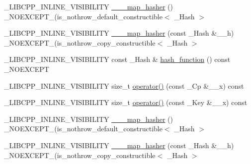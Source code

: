 \begin{DoxyCompactItemize}
\item 
\+\_\+\+L\+I\+B\+C\+P\+P\+\_\+\+I\+N\+L\+I\+N\+E\+\_\+\+V\+I\+S\+I\+B\+I\+L\+I\+T\+Y \hyperlink{class______map__hasher_3_01___key_00_01___cp_00_01___hash_00_01false_01_4_ae1078b1247c357a13a8d2f6ef1ec4399}{\+\_\+\+\_\+\+\_\+map\+\_\+hasher} () \+\_\+\+N\+O\+E\+X\+C\+E\+P\+T\+\_\+(is\+\_\+nothrow\+\_\+default\+\_\+constructible$<$ \+\_\+\+Hash $>$
\item 
\+\_\+\+L\+I\+B\+C\+P\+P\+\_\+\+I\+N\+L\+I\+N\+E\+\_\+\+V\+I\+S\+I\+B\+I\+L\+I\+T\+Y \hyperlink{class______map__hasher_3_01___key_00_01___cp_00_01___hash_00_01false_01_4_a76cca625eb676b114276721b9818cc0b}{\+\_\+\+\_\+\+\_\+map\+\_\+hasher} (const \+\_\+\+Hash \&\+\_\+\+\_\+h) \+\_\+\+N\+O\+E\+X\+C\+E\+P\+T\+\_\+(is\+\_\+nothrow\+\_\+copy\+\_\+constructible$<$ \+\_\+\+Hash $>$
\item 
\+\_\+\+L\+I\+B\+C\+P\+P\+\_\+\+I\+N\+L\+I\+N\+E\+\_\+\+V\+I\+S\+I\+B\+I\+L\+I\+T\+Y const \+\_\+\+Hash \& \hyperlink{class______map__hasher_3_01___key_00_01___cp_00_01___hash_00_01false_01_4_a36b4694cf944a1a28969d3f6917cc9a9}{hash\+\_\+function} () const \+\_\+\+N\+O\+E\+X\+C\+E\+P\+T
\item 
\+\_\+\+L\+I\+B\+C\+P\+P\+\_\+\+I\+N\+L\+I\+N\+E\+\_\+\+V\+I\+S\+I\+B\+I\+L\+I\+T\+Y size\+\_\+t \hyperlink{class______map__hasher_3_01___key_00_01___cp_00_01___hash_00_01false_01_4_a4320bf7187c7c20511393415142a3651}{operator()} (const \+\_\+\+Cp \&\+\_\+\+\_\+x) const 
\item 
\+\_\+\+L\+I\+B\+C\+P\+P\+\_\+\+I\+N\+L\+I\+N\+E\+\_\+\+V\+I\+S\+I\+B\+I\+L\+I\+T\+Y size\+\_\+t \hyperlink{class______map__hasher_3_01___key_00_01___cp_00_01___hash_00_01false_01_4_a81e792db8b661f6bbd204d69ffe6eb86}{operator()} (const \+\_\+\+Key \&\+\_\+\+\_\+x) const 
\item 
\+\_\+\+L\+I\+B\+C\+P\+P\+\_\+\+I\+N\+L\+I\+N\+E\+\_\+\+V\+I\+S\+I\+B\+I\+L\+I\+T\+Y \hyperlink{class______map__hasher_3_01___key_00_01___cp_00_01___hash_00_01false_01_4_ae1078b1247c357a13a8d2f6ef1ec4399}{\+\_\+\+\_\+\+\_\+map\+\_\+hasher} () \+\_\+\+N\+O\+E\+X\+C\+E\+P\+T\+\_\+(is\+\_\+nothrow\+\_\+default\+\_\+constructible$<$ \+\_\+\+Hash $>$
\item 
\+\_\+\+L\+I\+B\+C\+P\+P\+\_\+\+I\+N\+L\+I\+N\+E\+\_\+\+V\+I\+S\+I\+B\+I\+L\+I\+T\+Y \hyperlink{class______map__hasher_3_01___key_00_01___cp_00_01___hash_00_01false_01_4_a76cca625eb676b114276721b9818cc0b}{\+\_\+\+\_\+\+\_\+map\+\_\+hasher} (const \+\_\+\+Hash \&\+\_\+\+\_\+h) \+\_\+\+N\+O\+E\+X\+C\+E\+P\+T\+\_\+(is\+\_\+nothrow\+\_\+copy\+\_\+constructible$<$ \+\_\+\+Hash $>$

\end{DoxyCompactItemize}
